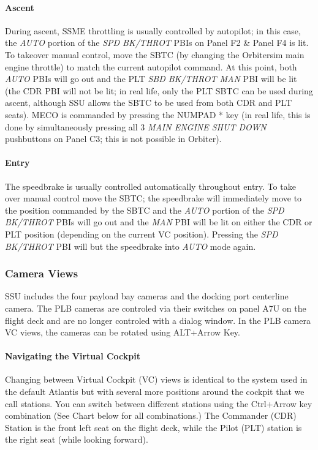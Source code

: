 \documentclass[13pt]{article}
\begin{document}
\begin{multicols}{2}
\paragraph{Ascent}
During ascent, SSME throttling is usually controlled by autopilot; in this case, the \textit{AUTO} portion of the \textit{SPD BK/THROT} PBIs on Panel F2 \& Panel F4 is lit. To takeover manual control, move the SBTC (by changing the Orbitersim main engine throttle) to match the current autopilot command. At this point, both \textit{AUTO} PBIs will go out and the PLT \textit{SBD BK/THROT MAN} PBI will be lit (the CDR PBI will not be lit; in real life, only the PLT SBTC can be used during ascent, although SSU allows the SBTC to be used from both CDR and PLT seats). MECO is commanded by pressing the NUMPAD * key (in real life, this is done by simultaneously pressing all 3 \textit{MAIN ENGINE SHUT DOWN} pushbuttons on Panel C3; this is not possible in Orbiter).

\paragraph{Entry}
The speedbrake is usually controlled automatically throughout entry. To take over manual control move the SBTC; the speedbrake will immediately move to the position commanded by the SBTC and the \textit{AUTO} portion of the \textit{SPD BK/THROT} PBIs will go out and the \textit{MAN} PBI will be lit on either the CDR or PLT position (depending on the current VC position). Pressing the \textit{SPD BK/THROT} PBI will but the speedbrake into \textit{AUTO} mode again.


\subsubsection{\large Camera Views}
SSU includes the four payload bay cameras and the docking port centerline camera. The PLB cameras are controled via their switches on panel A7U on the flight deck and are no longer controled with a dialog window. In the PLB camera VC views, the cameras can be rotated using ALT+Arrow Key.

\paragraph{Navigating the Virtual Cockpit}
Changing between Virtual Cockpit (VC) views is identical to the system used in the default Atlantis but with several more positions around the cockpit that we call stations. You can switch between different stations using the Ctrl+Arrow key combination (See Chart below for all combinations.) The Commander (CDR) Station is the front left seat on the flight deck, while the Pilot (PLT) station is the right seat (while looking forward).\\


\end{multicols}
\end{document}
